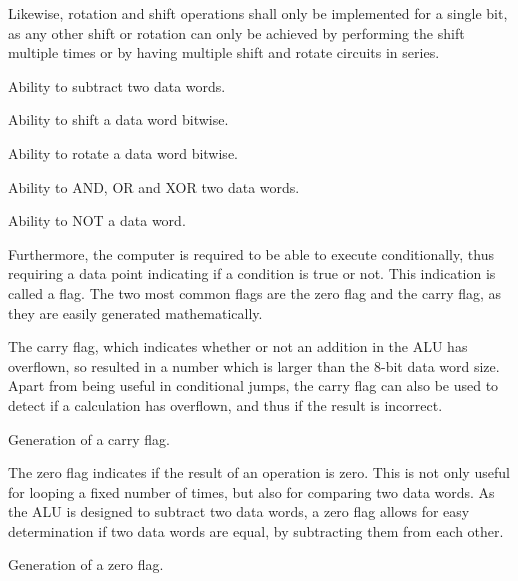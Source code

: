 Likewise, rotation and shift operations shall only be implemented for a single bit, as any other shift or rotation can only be achieved by performing the shift multiple times or by having multiple shift and rotate circuits in series.
\begin{feat-requirement}
  Ability to subtract two data words.
\end{feat-requirement}

\begin{feat-requirement}
  Ability to shift a data word bitwise.
\end{feat-requirement}

\begin{feat-requirement}
  Ability to rotate a data word bitwise.
\end{feat-requirement}

\begin{feat-requirement}
  Ability to AND, OR and XOR two data words.
\end{feat-requirement}

\begin{feat-requirement}
  Ability to NOT a data word.
\end{feat-requirement}

Furthermore, the computer is required to be able to execute conditionally, thus requiring a data point indicating if a condition is true or not. This indication is called a flag. The two most common flags are the zero flag and the carry flag, as they are easily generated mathematically. 

The carry flag, which indicates whether or not an addition in the ALU has overflown, so resulted in a number which is larger than the 8-bit data word size. Apart from being useful in conditional jumps, the carry flag can also be used to detect if a calculation has overflown, and thus if the result is incorrect.

\begin{turing-requirement}
  Generation of a carry flag. 
\end{turing-requirement}

The zero flag indicates if the result of an operation is zero. This is not only useful for looping a fixed number of times, but also for comparing two data words. As the ALU is designed to subtract two data words, a zero flag allows for easy determination if two data words are equal, by subtracting them from each other. 

\begin{feat-requirement}
  Generation of a zero flag.
\end{feat-requirement}

